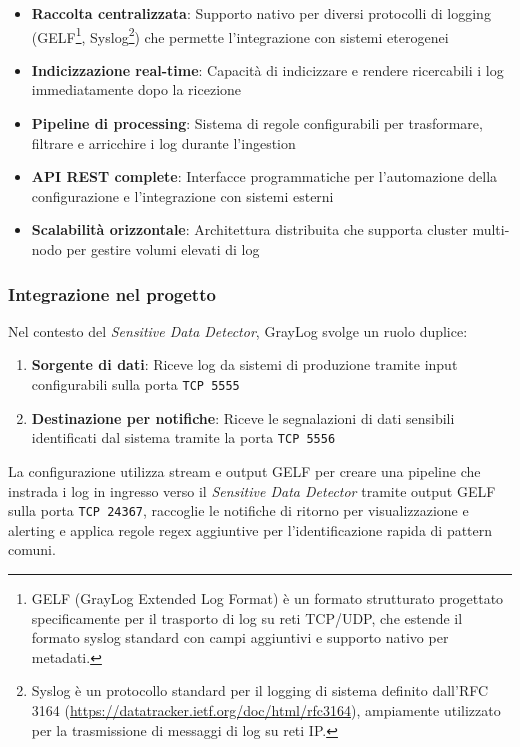 \documentclass[12pt]{report}
\begin{document}
\begin{itemize}
    \item \textbf{Raccolta centralizzata}: Supporto nativo per diversi protocolli di logging (GELF\footnote{GELF (GrayLog Extended Log Format) è un formato strutturato progettato specificamente per il trasporto di log su reti TCP/UDP, che estende il formato syslog standard con campi aggiuntivi e supporto nativo per metadati.}, Syslog\footnote{Syslog è un protocollo standard per il logging di sistema definito dall'RFC 3164 (\url{https://datatracker.ietf.org/doc/html/rfc3164}), ampiamente utilizzato per la trasmissione di messaggi di log su reti IP.}) che permette l'integrazione con sistemi eterogenei
    \item \textbf{Indicizzazione real-time}: Capacità di indicizzare e rendere ricercabili i log immediatamente dopo la ricezione
    \item \textbf{Pipeline di processing}: Sistema di regole configurabili per trasformare, filtrare e arricchire i log durante l'ingestion
    \item \textbf{API REST complete}: Interfacce programmatiche per l'automazione della configurazione e l'integrazione con sistemi esterni
    \item \textbf{Scalabilità orizzontale}: Architettura distribuita che supporta cluster multi-nodo per gestire volumi elevati di log
\end{itemize}

\subsubsection{Integrazione nel progetto}
Nel contesto del \textit{Sensitive Data Detector}, GrayLog svolge un ruolo duplice:

\begin{enumerate}
    \item \textbf{Sorgente di dati}: Riceve log da sistemi di produzione tramite input configurabili sulla porta \texttt{TCP 5555}
    \item \textbf{Destinazione per notifiche}: Riceve le segnalazioni di dati sensibili identificati dal sistema tramite la porta \texttt{TCP 5556}
\end{enumerate}

La configurazione utilizza stream e output GELF per creare una pipeline che instrada i log in ingresso verso il \textit{Sensitive Data Detector} tramite output GELF sulla porta \texttt{TCP 24367}, raccoglie le notifiche di ritorno per visualizzazione e alerting e applica regole regex aggiuntive per l'identificazione rapida di pattern comuni.
\end{document}
